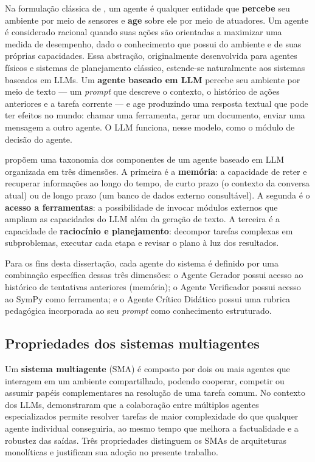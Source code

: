 Na formulação clássica de \citet{russell2021aima}, um agente é qualquer entidade que \textbf{percebe}
seu ambiente por meio de sensores e \textbf{age} sobre ele por meio de atuadores. Um agente é
considerado racional quando suas ações são orientadas a maximizar uma medida de desempenho, dado o
conhecimento que possui do ambiente e de suas próprias capacidades. Essa abstração, originalmente
desenvolvida para agentes físicos e sistemas de planejamento clássico, estende-se naturalmente aos
sistemas baseados em LLMs. Um \textbf{agente baseado em LLM} percebe seu ambiente por meio de texto
--- um \emph{prompt} que descreve o contexto, o histórico de ações anteriores e a tarefa corrente ---
e age produzindo uma resposta textual que pode ter efeitos no mundo: chamar uma ferramenta, gerar um
documento, enviar uma mensagem a outro agente. O LLM funciona, nesse modelo, como o módulo de decisão
do agente.

\citet{wang2023agentsurvey} propõem uma taxonomia dos componentes de um agente baseado em LLM
organizada em três dimensões. A primeira é a \textbf{memória}: a capacidade de reter e recuperar
informações ao longo do tempo, de curto prazo (o contexto da conversa atual) ou de longo prazo (um
banco de dados externo consultável). A segunda é o \textbf{acesso a ferramentas}: a possibilidade de
invocar módulos externos que ampliam as capacidades do LLM além da geração de texto. A terceira é a
capacidade de \textbf{raciocínio e planejamento}: decompor tarefas complexas em subproblemas,
executar cada etapa e revisar o plano à luz dos resultados.

Para os fins desta dissertação, cada agente do sistema é definido por uma combinação específica
dessas três dimensões: o Agente Gerador possui acesso ao histórico de tentativas anteriores
(memória); o Agente Verificador possui acesso ao SymPy como ferramenta; e o Agente Crítico Didático
possui uma rubrica pedagógica incorporada ao seu \emph{prompt} como conhecimento estruturado.

\subsection{Propriedades dos sistemas multiagentes}
\label{sub:sma}

Um \textbf{sistema multiagente} (SMA) é composto por dois ou mais agentes que interagem em um
ambiente compartilhado, podendo cooperar, competir ou assumir papéis complementares na resolução de
uma tarefa comum. No contexto dos LLMs, \citet{wu2023autogen} demonstraram que a colaboração entre
múltiplos agentes especializados permite resolver tarefas de maior complexidade do que qualquer
agente individual conseguiria, ao mesmo tempo que melhora a factualidade e a robustez das saídas.
Três propriedades distinguem os SMAs de arquiteturas monolíticas e justificam sua adoção no presente
trabalho.

